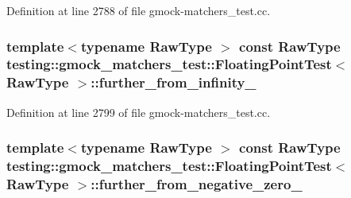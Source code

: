 Definition at line 2788 of file gmock-\/matchers\+\_\+test.\+cc.

\subsubsection[{\texorpdfstring{further\+\_\+from\+\_\+infinity\+\_\+}{further_from_infinity_}}]{\setlength{\rightskip}{0pt plus 5cm}template$<$typename Raw\+Type $>$ const Raw\+Type {\bf testing\+::gmock\+\_\+matchers\+\_\+test\+::\+Floating\+Point\+Test}$<$ Raw\+Type $>$\+::further\+\_\+from\+\_\+infinity\+\_\+\hspace{0.3cm}{\ttfamily [protected]}}\hypertarget{classtesting_1_1gmock__matchers__test_1_1_floating_point_test_a603ab51280ecb1c4147c2660a7a90728}{}\label{classtesting_1_1gmock__matchers__test_1_1_floating_point_test_a603ab51280ecb1c4147c2660a7a90728}


Definition at line 2799 of file gmock-\/matchers\+\_\+test.\+cc.

\subsubsection[{\texorpdfstring{further\+\_\+from\+\_\+negative\+\_\+zero\+\_\+}{further_from_negative_zero_}}]{\setlength{\rightskip}{0pt plus 5cm}template$<$typename Raw\+Type $>$ const Raw\+Type {\bf testing\+::gmock\+\_\+matchers\+\_\+test\+::\+Floating\+Point\+Test}$<$ Raw\+Type $>$\+::further\+\_\+from\+\_\+negative\+\_\+zero\+\_\+\hspace{0.3cm}{\ttfamily [protected]}}\hypertarget{classtesting_1_1gmock__matchers__test_1_1_floating_point_test_acc020c4d830d9e9d910b92bb466d540f}{}\label{classtesting_1_1gmock__matchers__test_1_1_floating_point_test_acc020c4d830d9e9d910b92bb466d540f}


